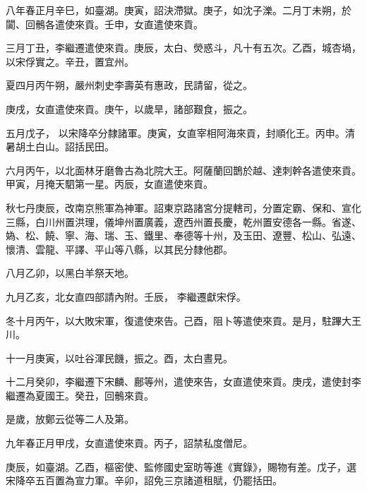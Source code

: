 
\begin{pinyinscope}

 八年春正月辛巳，如臺湖。庚寅，詔決滯獄。庚子，如沈子濼。二月丁未朔，於闐、回鶻各遣使來貢。壬申，女直遣使來貢。



 三月丁丑，李繼遷遣使來貢。庚辰，太白、熒惑斗，凡十有五次。乙酉，城杏堝，以宋俘實之。辛丑，置宜州。



 夏四月丙午朔，嚴州刺史李壽英有惠政，民請留，從之。



 庚戌，女直遣使來貢。庚午，以歲旱，諸部艱食，振之。



 五月戊子，
 以宋降卒分隸諸軍。庚寅，女直宰相阿海來貢，封順化王。丙申。清暑胡土白山。詔括民田。



 六月丙午，以北面林牙磨魯古為北院大王。阿薩蘭回鵲於越、達刺幹各遣使來貢。甲寅，月掩天駟第一星。丙辰，女直遣使來貢。



 秋七丹庚辰，改南京熊軍為神軍。詔東京路諸宮分提轄司，分置定霸、保和、宣化三縣，白川州置洪理，儀坤州置廣義，遼西州置長慶，乾州置安德各一縣。省遂、媯、松、饒、寧、海、瑞、玉、鐵里、奉德等十州，及玉田、遼豐、松山、弘遠、懷清、雲龍、平譯、平山等八縣，以其民分隸他郡。



 八月乙卯，以黑白羊祭天地。



 九月乙亥，北女直四部請內附。壬辰，
 李繼遷獻宋俘。



 冬十月丙午，以大敗宋軍，復遣使來告。己酉，阻卜等遣使來貢。是月，駐蹕大王川。



 十一月庚寅，以吐谷渾民饑，振之。酉，太白晝見。



 十二月癸卯，李繼遷下宋麟、鄜等州，遣使來告，女直遣使來貢。庚戌，遣使封李繼遷為夏國王。癸丑，回鶻來貢。



 是歲，放鄭云從等二人及第。



 九年春正月甲戌，女直遣使來貢。丙子，詔禁私度僧尼。



 庚辰，如臺湖。乙酉，樞密使、監修國史室昉等進《實錄》，賜物有差。戊子，選宋降卒五百置為宣力軍。辛卯，詔免三京諸道租賦，仍罷括田。




\end{pinyinscope}
